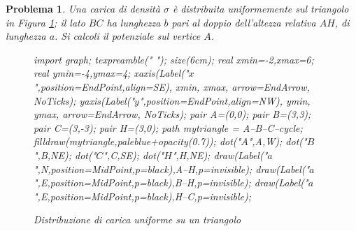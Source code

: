\documentclass[b5paper,twoside]{book}
\newtheorem{problema}{Problema}
\let\oldhat\hat
\renewcommand{\vec}[1]{\mathbf{#1}}
\renewcommand{\hat}[1]{\widehat{\mathbf{#1}}}
\begin{document}
\begin{problema}
	Una carica di densità $\sigma$ è distribuita uniformemente sul triangolo in Figura
	\ref{fig:potenziale_triangolo}; il lato $BC$ ha lunghezza $b$ pari al doppio
	dell'altezza relativa $AH$, di lunghezza $a$. Si calcoli il potenziale sul vertice $A$.
	\begin{figure}[H]
			\centering
			\begin{asy}
				import graph;
				texpreamble("\let\oldhat\hat
				\renewcommand{\vec}[1]{\mathbf{#1}}
				\renewcommand{\hat}[1]{\oldhat{\mathbf{#1}}}");
				size(6cm);
				real xmin=-2,xmax=6;
				real ymin=-4,ymax=4;
				xaxis(Label("\small $x$",position=EndPoint,align=SE),
				xmin, xmax, arrow=EndArrow, NoTicks);
				yaxis(Label("\small $y$",position=EndPoint,align=NW),
				ymin, ymax, arrow=EndArrow, NoTicks);
				pair A=(0,0);
				pair B=(3,3);
				pair C=(3,-3);
				pair H=(3,0);
				path mytriangle = A--B--C--cycle;
				filldraw(mytriangle,paleblue+opacity(0.7));
				dot("\small $A$",A,W);
				dot("\small $B$",B,NE);
				dot("\small $C$",C,SE);
				dot("\small $H$",H,NE);
				draw(Label("\small $a$",N,position=MidPoint,p=black),A--H,p=invisible);
				draw(Label("\small $a$",E,position=MidPoint,p=black),B--H,p=invisible);
				draw(Label("\small $a$",E,position=MidPoint,p=black),H--C,p=invisible);
			\end{asy}
			\caption{Distribuzione di carica uniforme su un triangolo}
			\label{fig:potenziale_triangolo}
		\end{figure}
\end{problema}
\end{document}
